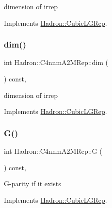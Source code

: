 dimension of irrep 

Implements \mbox{\hyperlink{structHadron_1_1CubicLGRep_a3acbaea26503ed64f20df693a48e4cdd}{Hadron\+::\+Cubic\+L\+G\+Rep}}.

\mbox{\label{structHadron_1_1C4nnmA2MRep_a5c3be88143a9c05ede78e8d988d21c52}} 
\subsubsection{\texorpdfstring{dim()}{dim()}\hspace{0.1cm}{\footnotesize\ttfamily [3/3]}}
{\footnotesize\ttfamily int Hadron\+::\+C4nnm\+A2\+M\+Rep\+::dim (\begin{DoxyParamCaption}{ }\end{DoxyParamCaption}) const\hspace{0.3cm}{\ttfamily [inline]}, {\ttfamily [virtual]}}

dimension of irrep 

Implements \mbox{\hyperlink{structHadron_1_1CubicLGRep_a3acbaea26503ed64f20df693a48e4cdd}{Hadron\+::\+Cubic\+L\+G\+Rep}}.

\mbox{\label{structHadron_1_1C4nnmA2MRep_a4a41dd35707514a4f23fe162a37918b4}} 
\subsubsection{\texorpdfstring{G()}{G()}\hspace{0.1cm}{\footnotesize\ttfamily [1/3]}}
{\footnotesize\ttfamily int Hadron\+::\+C4nnm\+A2\+M\+Rep\+::G (\begin{DoxyParamCaption}{ }\end{DoxyParamCaption}) const\hspace{0.3cm}{\ttfamily [inline]}, {\ttfamily [virtual]}}

G-\/parity if it exists 

Implements \mbox{\hyperlink{structHadron_1_1CubicLGRep_ace26f7b2d55e3a668a14cb9026da5231}{Hadron\+::\+Cubic\+L\+G\+Rep}}.

\mbox{\label{structHadron_1_1C4nnmA2MRep_a4a41dd35707514a4f23fe162a37918b4}} 
